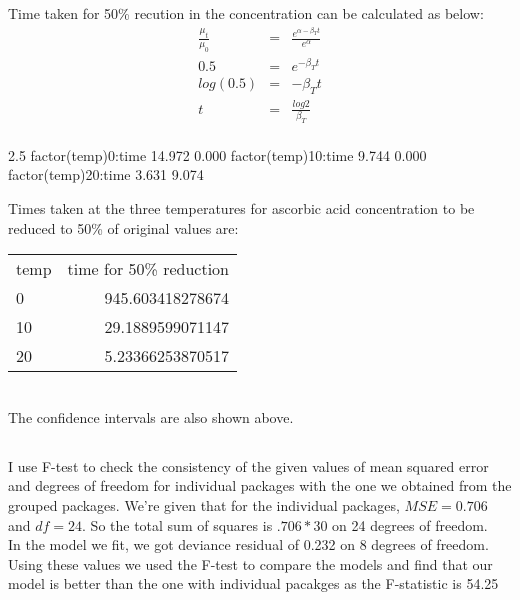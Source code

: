 \documentclass{article}
\begin{document}
\subsection{}
Time taken for 50\% recution in the concentration can be calculated as below:\\
\begin{eqnarray*}
\frac{\mu_t}{\mu_0}&=&\frac{e^{\alpha-\beta_T t}}{e^{\alpha}}\\
0.5 &=& e^{-\beta_T t}\\
log(0.5)&=& -\beta_T t\\
t&=&\frac{log2}{\beta_T}\\
\end{eqnarray*}


\begin{Schunk}
\begin{Soutput}
                     2.5 % 97.5 %
factor(temp)0:time  14.972  0.000
factor(temp)10:time  9.744  0.000
factor(temp)20:time  3.631  9.074
\end{Soutput}
\end{Schunk}
Times taken at the three temperatures for ascorbic acid concentration to be reduced to 50\% of original values are:\\
\begin{tabular}{l|r}
  \hline
  temp & time for 50\% reduction\\
  0 & 945.603418278674\\
  10 & 29.1889599071147\\
  20  & 5.23366253870517\\
  \hline
\end{tabular}\\
The confidence intervals are also shown above.

\subsection{}


I use F-test to check the consistency of the given values of mean squared error and degrees of freedom for individual packages with the one we obtained from the grouped packages. We're given that for the individual packages, $MSE=0.706$ and $df=24$. So the total sum of squares is $.706*30$ on 24 degrees of freedom.\\
In the model we fit, we got deviance residual of 0.232 on 8 degrees of freedom. Using these values we used the F-test to compare the models and find that our model is better than the one with individual pacakges as the F-statistic is 54.25\\
\end{document}
